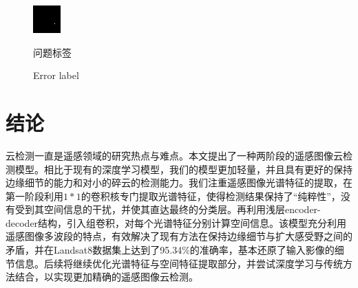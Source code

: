 \documentclass[10pt]{ctexart}
\begin{document}
\begin{multicols}{2}
\begin{figure}[H]
{\begin{minipage}[b]{0.15\linewidth}
            \includegraphics[width=1\linewidth]{../log/spoon2/cut2/tmp_cut_LC81620432014072LGN00_16329_unet.jpg}\vspace{4pt}
        \end{minipage}
    }
\caption{问题标签}
\addtocounter{figure}{-1}
\vspace{-5pt}
\renewcommand{\figurename}{Fig}
\caption{Error label}
\renewcommand{\figurename}{图}
\label{Fig.main2}
\end{figure}

\section[]{结论}
云检测一直是遥感领域的研究热点与难点。本文提出了一种两阶段的遥感图像云检测模型。相比于现有的深度学习模型，我们的模型更加轻量，并且具有更好的保持边缘细节的能力和对小的碎云的检测能力。我们注重遥感图像光谱特征的提取，在第一阶段利用$1*1$的卷积核专门提取光谱特征，使得检测结果保持了“纯粹性”，没有受到其空间信息的干扰，并使其直达最终的分类层。再利用浅层encoder-decoder结构，引入组卷积，对每个光谱特征分别计算空间信息。该模型充分利用遥感图像多波段的特点，有效解决了现有方法在保持边缘细节与扩大感受野之间的矛盾，并在Landsat8数据集上达到了95.34\%的准确率，基本还原了输入影像的细节信息。后续将继续优化光谱特征与空间特征提取部分，并尝试深度学习与传统方法结合，以实现更加精确的遥感图像云检测。


\end{multicols}
\end{document}
